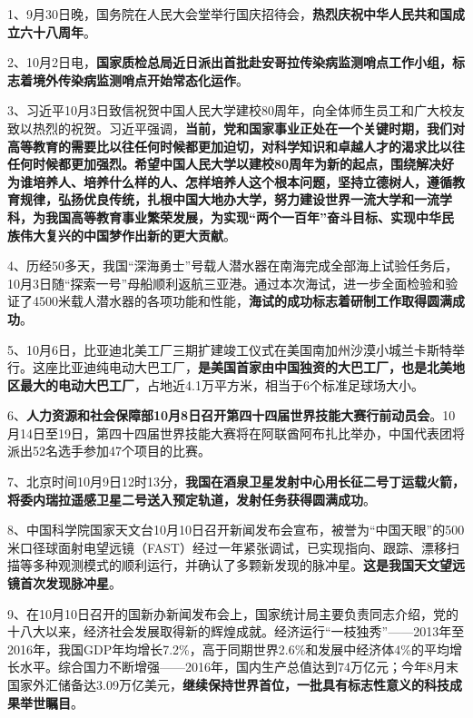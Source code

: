 {1、{9月30日晚，国务院在人民大会堂举行国庆招待会，}\textbf{{热烈庆祝中华人民共和国成立六十八周年}}{。}}

{2、}{{}{10月2日电，}\textbf{{国家质检总局近日派出首批赴安哥拉传染病监测哨点工作小组，标志着境外传染病监测哨点开始常态化运作}}{。}}

{{3、}{习近平10月3日致信祝贺中国人民大学建校80周年，向全体师生员工和广大校友致以热烈的祝贺。习近平强调，}\textbf{{当前，党和国家事业正处在一个关键时期，我们对高等教育的需要比以往任何时候都更加迫切，对科学知识和卓越人才的渴求比以往任何时候都更加强烈。希望中国人民大学以建校80周年为新的起点，围绕解决好为谁培养人、培养什么样的人、怎样培养人这个根本问题，坚持立德树人，遵循教育规律，弘扬优良传统，扎根中国大地办大学，努力建设世界一流大学和一流学科，为我国高等教育事业繁荣发展，为实现``两个一百年''奋斗目标、实现中华民族伟大复兴的中国梦作出新的更大贡献}}{。}}

{{4、}{历经50多天，我国``深海勇士''号载人潜水器在南海完成全部海上试验任务后，10月3日随``探索一号''母船顺利返航三亚港。通过本次海试，进一步全面检验和验证了4500米载人潜水器的各项功能和性能，}\textbf{{海试的成功标志着研制工作取得圆满成功}}{。}}

{{5、10月6日，比亚迪北美工厂三期扩建竣工仪式在美国南加州沙漠小城兰卡斯特举行。这座比亚迪纯电动大巴工厂，}\textbf{{是美国首家由中国独资的大巴工厂，也是北美地区最大的电动大巴工厂}}{，占地近4.1万平方米，相当于6个标准足球场大小。}}

{6、}\textbf{{人力资源和社会保障部10月8日召开第四十四届世界技能大赛行前动员会}}{。10月14日至19日，第四十四届世界技能大赛将在阿联酋阿布扎比举办，中国代表团将派出52名选手参加47个项目的比赛。}

{{7、北京时间10月9日12时13分，}\textbf{{我国在酒泉卫星发射中心用长征二号丁运载火箭，将委内瑞拉遥感卫星二号送入预定轨道，发射任务获得圆满成功}}{。}}

{{8、中国科学院国家天文台10月10日召开新闻发布会宣布，被誉为``中国天眼''的500米口径球面射电望远镜（FAST）经过一年紧张调试，已实现指向、跟踪、漂移扫描等多种观测模式的顺利运行，并确认了多颗新发现的脉冲星。}\textbf{{这是我国天文望远镜首次发现脉冲星}}{。}}

{{9、在10月10日召开的国新办新闻发布会上，国家统计局主要负责同志介绍，党的十八大以来，经济社会发展取得新的辉煌成就。经济运行``一枝独秀''------2013年至2016年，我国GDP年均增长7.2\%，高于同期世界2.6\%和发展中经济体4\%的平均增长水平。综合国力不断增强------2016年，国内生产总值达到74万亿元；今年8月末国家外汇储备达3.09万亿美元，}\textbf{{继续保持世界首位，一批具有标志性意义的科技成果举世瞩目}}{。}}

